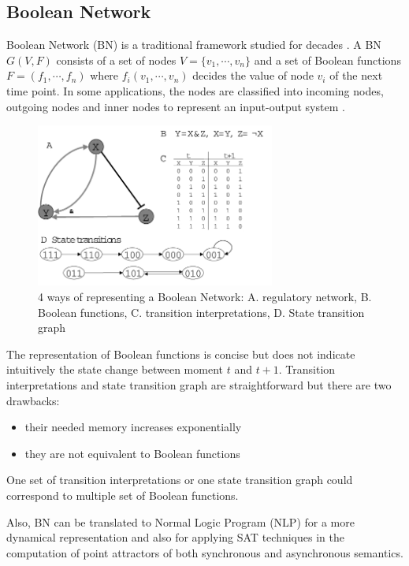 \subsection{Boolean Network}
Boolean Network (BN) is a traditional framework studied for decades \cite{kauffman1969}.
A BN $G(V,F)$ consists of a set of nodes $V=\{v_1,\cdots,v_n\}$ and a set of Boolean functions $F=(f_1,\cdots,f_n)$ where $f_i(v_1,\cdots,v_n)$ decides the value of node $v_i$ of the next time point.
In some applications, the nodes are classified into incoming nodes, outgoing nodes and inner nodes to represent an input-output system \cite{akutsu2007control}.
\begin{figure}
    \centering
    \includegraphics[width=0.7\textwidth]{BooleanNetwork.png}
    \caption[Boolean Network]{4 ways of representing a Boolean Network: A. regulatory network, B. Boolean functions, C. transition interpretations, D. State transition graph}
    \label{fig:booleannetwork}
\end{figure}

The representation of Boolean functions is concise but does not indicate intuitively the state change between moment $t$ and $t+1$.
Transition interpretations and state transition graph are straightforward but there are two drawbacks: 
\begin{itemize}
    \item their needed memory increases exponentially
    \item they are not equivalent to Boolean functions
\end{itemize}
One set of transition interpretations or one state transition graph could correspond to multiple set of Boolean functions.

Also, BN can be translated to Normal Logic Program (NLP) \cite{inoue2011logic} for a more dynamical representation and also for applying SAT techniques in the computation of point attractors of both synchronous and asynchronous semantics.

